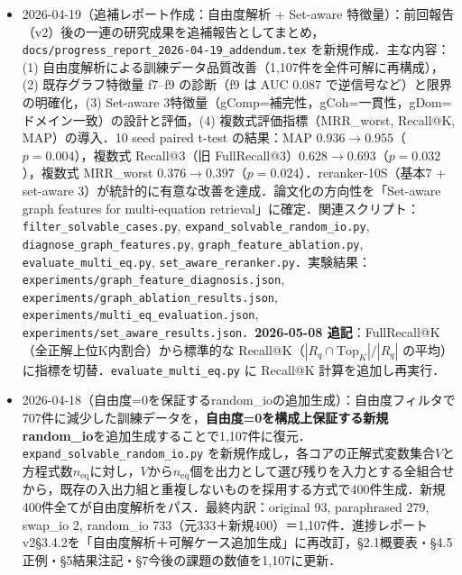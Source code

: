 \documentclass[11pt,a4paper]{jsarticle}
\begin{document}
\begin{itemize}[nosep]
  \item 2026-04-19（追補レポート作成：自由度解析 + Set-aware 特徴量）：前回報告（v2）後の一連の研究成果を追補報告としてまとめ，\texttt{docs/progress\_report\_2026-04-19\_addendum.tex} を新規作成．主な内容：(1) 自由度解析による訓練データ品質改善（1{,}107件を全件可解に再構成），(2) 既存グラフ特徴量 f7--f9 の診断（f9 は AUC 0.087 で逆信号など）と限界の明確化，(3) Set-aware 3特徴量（gComp=補完性，gCoh=一貫性，gDom=ドメイン一致）の設計と評価，(4) 複数式評価指標（MRR\_worst, Recall@K, MAP）の導入．10 seed paired t-test の結果：MAP $0.936 \to 0.955$（$p=0.004$），複数式 Recall@3（旧 FullRecall@3）$0.628 \to 0.693$（$p=0.032$），複数式 MRR\_worst $0.376 \to 0.397$（$p=0.024$）．reranker-10S（基本7 + set-aware 3）が統計的に有意な改善を達成．論文化の方向性を「Set-aware graph features for multi-equation retrieval」に確定．関連スクリプト：\texttt{filter\_solvable\_cases.py}, \texttt{expand\_solvable\_random\_io.py}, \texttt{diagnose\_graph\_features.py}, \texttt{graph\_feature\_ablation.py}, \texttt{evaluate\_multi\_eq.py}, \texttt{set\_aware\_reranker.py}．実験結果：\texttt{experiments/graph\_feature\_diagnosis.json}, \texttt{experiments/graph\_ablation\_results.json}, \texttt{experiments/multi\_eq\_evaluation.json}, \texttt{experiments/set\_aware\_results.json}．\textbf{2026-05-08 追記}：FullRecall@K（全正解上位K内割合）から標準的な Recall@K（$|R_q \cap \mathrm{Top}_K|/|R_q|$ の平均）に指標を切替．\texttt{evaluate\_multi\_eq.py} に Recall@K 計算を追加し再実行．

  \item 2026-04-18（自由度=0を保証するrandom\_ioの追加生成）：自由度フィルタで707件に減少した訓練データを，\textbf{自由度=0を構成上保証する新規random\_io}を追加生成することで1,107件に復元．\texttt{expand\_solvable\_random\_io.py} を新規作成し，各コアの正解式変数集合$V$と方程式数$n_{\text{eq}}$に対し，$V$から$n_{\text{eq}}$個を出力として選び残りを入力とする全組合せから，既存の入出力組と重複しないものを採用する方式で400件生成．新規400件全てが自由度解析をパス．最終内訳：original 93, paraphrased 279, swap\_io 2, random\_io 733（元333＋新規400）＝1,107件．進捗レポートv2§3.4.2を「自由度解析＋可解ケース追加生成」に再改訂，§2.1概要表・§4.5正例・§5結果注記・§7今後の課題の数値を1,107に更新．


\end{itemize}
\end{document}
